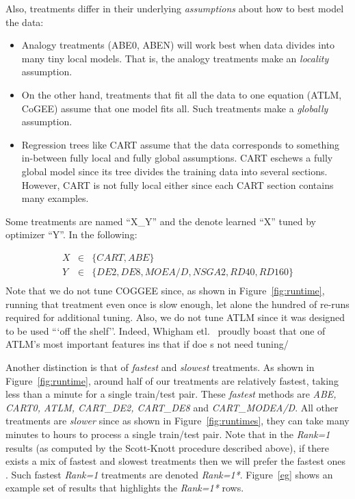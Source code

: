 \documentclass[10pt,conference]{IEEEtran}
\newcommand{\bi}{\begin{itemize}}
\newcommand{\ei}{\end{itemize}}
\newcommand{\fig}[1]{Figure~\ref{fig:#1}}
\begin{document}
Also, treatments differ in  their underlying  {\em assumptions} about how to best model the data:
\bi
\item Analogy treatments (ABE0, ABEN) will work best when data divides into many tiny local models. That is, the analogy treatments make an {\em locality} assumption.
\item On the other hand, treatments that fit all the data to one equation (ATLM, CoGEE) assume that one model fits all. Such treatments make a {\em globally} assumption.
\item Regression trees like CART assume that the data corresponds to something in-between fully local and fully global assumptions. CART eschews a fully global model since its tree divides the training data into several sections. However, CART is not fully local either since each CART section contains many examples.
\ei


Some treatments are named ``X\_Y'' and the denote learned ``X'' tuned by optimizer ``Y''.
In the following: 

{\small \begin{eqnarray} 
X &\in &\{\mathit{CART},\mathit{ABE}\}\nonumber\\
Y &\in &\{\mathit{DE2},\mathit{DE8},\mathit{MOEA/D},\mathit{NSGA2},\mathit{RD40}, \mathit{RD160}\}\nonumber\\
\end{eqnarray}}
Note that we do not tune COGGEE since, as shown in \fig{runtime}, running that treatment even once is slow enough, let alone the hundred of re-runs required for additional tuning. Also, we do not tune ATLM since it was designed to be used ```off the shelf''. Indeed, Whigham etl.~\cite{w15} proudly boast that one of ATLM's most important features ins that if doe s not need tuning/

Another   distinction is  that of {\em fastest} and {\em slowest} treatments.
As shown in \fig{runtime}, around half of our treatments are relatively fastest, taking less than a minute for a single train/test pair. These 
{\em fastest} methods are {\em ABE, CART0, ATLM, CART\_DE2, CART\_DE8} and {\em CART\_MODEA/D}.
All other treatments are {\em slower} since as shown in  \fig{runtimes}, they can take many minutes to hours to process a single train/test pair.
Note that in the {\em Rank=1} results (as computed by the Scott-Knott procedure described above),  if there exists a mix of fastest and slowest treatments
then we will prefer the fastest ones . Such fastest {\em Rank=1} treatments are  denoted {\em Rank=1*}. 
Figure~\ref{eg} shows an example
set of results that highlights the {\em Rank=1*} rows.
\end{document}

